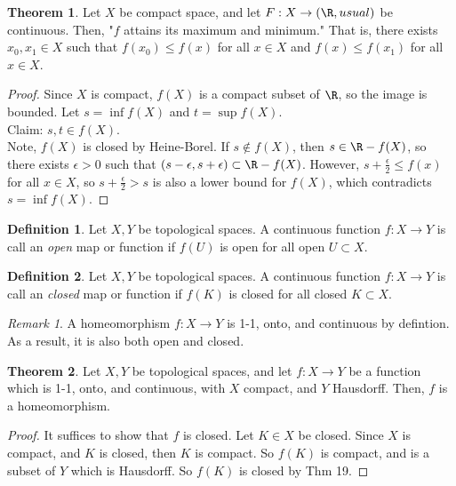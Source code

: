 \documentclass[a5paper]{article}
\theoremstyle{definition}%
\newtheorem{theorem}{Theorem}
\newtheorem*{definition*}{Definition}
\numberwithin{exercise}{section}
\theoremstyle{remark}%
\newtheorem*{remark*}{Remark}
\begin{document}
\begin{highlight}
\begin{theorem}
Let $X$ be compact space, and let $F:X\to (\R,usual)$ be continuous. Then, "$f$ attains its maximum and minimum." That is, there exists $x_0,x_1\in X$ such that $f(x_0)\leq f(x)$ for all $x\in X$ and $f(x)\leq f(x_1)$ for all $x\in X$. 
\end{theorem}
\end{highlight}
\begin{proof}
Since $X$ is compact, $f(X)$ is a compact subset of $\R$, so the image is bounded. Let $s=\inf f(X)$ and $t=\sup f(X)$. \\
Claim: $s,t\in f(X)$. \\
Note, $f(X)$ is closed by Heine-Borel. If $s\not\in f(X)$, then $s\in\R-f(X)$, so there exists $\epsilon>0$ such that $(s-\epsilon, s+\epsilon)\subset \R-f(X)$. However, $s+\frac{\epsilon}{2}\leq f(x)$ for all $x\in X$, so $s+\frac{\epsilon}{2}>s$ is also a lower bound for $f(X)$, which contradicts $s=\inf f(X)$. 
\end{proof}

\begin{definition*}
Let $X,Y$ be topological spaces. A continuous function $f:X\to Y$ is call an \emph{open} map or function if $f(U)$ is open for all open $U\subset X$. 
\end{definition*}

\begin{definition*}
Let $X,Y$ be topological spaces. A continuous function $f:X\to Y$ is call an \emph{closed} map or function if $f(K)$ is closed for all closed $K\subset X$. 
\end{definition*}

\begin{remark*}
A homeomorphism $f:X\to Y$ is 1-1, onto, and continuous by defintion. As a result, it is also both open and closed. 
\end{remark*}

\begin{highlight}
\begin{theorem}
Let $X,Y$ be topological spaces, and let $f:X\to Y$ be a function which is 1-1, onto, and continuous, with $X$ compact, and $Y$ Hausdorff. Then, $f$ is a homeomorphism. 
\end{theorem}
\end{highlight}
\begin{proof}
It suffices to show that $f$ is closed. Let $K\in X$ be closed. Since $X$ is compact, and $K$ is closed, then $K$ is compact. So $f(K)$ is compact, and is a subset of $Y$ which is Hausdorff. So $f(K)$ is closed by Thm 19. 
\end{proof}
\end{document}
